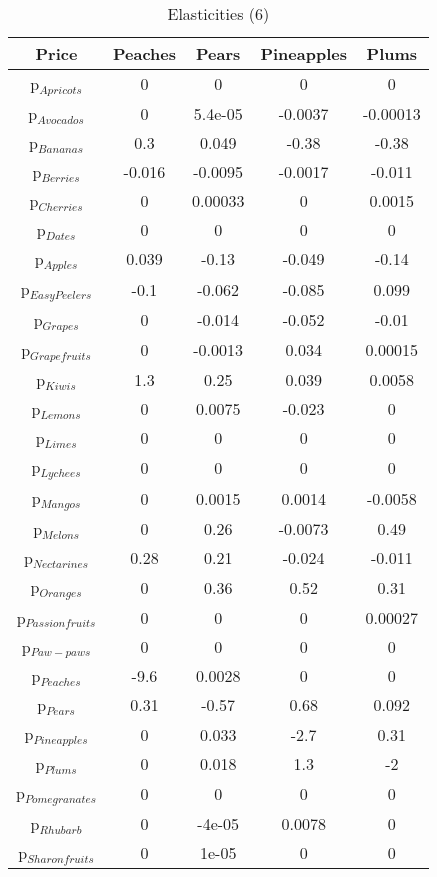 \documentclass[11pt]{article}
\begin{document}
\begin{table}[h]
\caption{Elasticities (6)}
\label{Table: elasticities 6}
\begin{center}
\begin{tabular}{ccccc}
Price & Peaches & Pears & Pineapples & Plums \\ \hline
p$_{Apricots}$ & 0 & 0 & 0 & 0 \\ 
p$_{Avocados}$ & 0 & 5.4e-05 & -0.0037 & -0.00013 \\ 
p$_{Bananas}$ & 0.3 & 0.049 & -0.38 & -0.38 \\ 
p$_{Berries}$ & -0.016 & -0.0095 & -0.0017 & -0.011 \\ 
p$_{Cherries}$ & 0 & 0.00033 & 0 & 0.0015 \\ 
p$_{Dates}$ & 0 & 0 & 0 & 0 \\ 
p$_{Apples}$ & 0.039 & -0.13 & -0.049 & -0.14 \\ 
p$_{Easy Peelers}$ & -0.1 & -0.062 & -0.085 & 0.099 \\ 
p$_{Grapes}$ & 0 & -0.014 & -0.052 & -0.01 \\ 
p$_{Grapefruits}$ & 0 & -0.0013 & 0.034 & 0.00015 \\ 
p$_{Kiwis}$ & 1.3 & 0.25 & 0.039 & 0.0058 \\ 
p$_{Lemons}$ & 0 & 0.0075 & -0.023 & 0 \\ 
p$_{Limes}$ & 0 & 0 & 0 & 0 \\ 
p$_{Lychees}$ & 0 & 0 & 0 & 0 \\ 
p$_{Mangos}$ & 0 & 0.0015 & 0.0014 & -0.0058 \\ 
p$_{Melons}$ & 0 & 0.26 & -0.0073 & 0.49 \\ 
p$_{Nectarines}$ & 0.28 & 0.21 & -0.024 & -0.011 \\ 
p$_{Oranges}$ & 0 & 0.36 & 0.52 & 0.31 \\ 
p$_{Passion fruits}$ & 0 & 0 & 0 & 0.00027 \\ 
p$_{Paw-paws}$ & 0 & 0 & 0 & 0 \\ 
p$_{Peaches}$ & -9.6 & 0.0028 & 0 & 0 \\ 
p$_{Pears}$ & 0.31 & -0.57 & 0.68 & 0.092 \\ 
p$_{Pineapples}$ & 0 & 0.033 & -2.7 & 0.31 \\ 
p$_{Plums}$ & 0 & 0.018 & 1.3 & -2 \\ 
p$_{Pomegranates}$ & 0 & 0 & 0 & 0 \\ 
p$_{Rhubarb}$ & 0 & -4e-05 & 0.0078 & 0 \\ 
p$_{Sharon fruits}$ & 0 & 1e-05 & 0 & 0 \\ 
\end{tabular}
\end{center}
\end{table}
\end{document}

